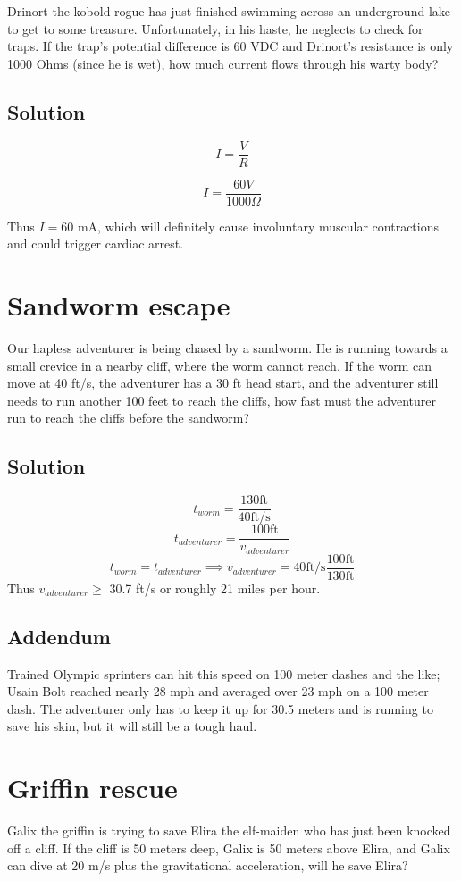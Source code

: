 \documentclass[12pt,letterpaper]{article}
\begin{document}
Drinort the kobold rogue has just finished swimming across an underground lake to get to some treasure. Unfortunately, in his haste, he neglects to check for traps. If the trap's potential difference is 60 VDC and Drinort's resistance is only 1000 Ohms (since he is wet), how much current flows through his warty body?

\subsection{Solution}

\[I = \frac{V}{R} \]

\[I = \frac{60 V}{1000 \Omega}\]

Thus $I = 60$ mA, which will definitely cause involuntary muscular contractions and could trigger cardiac arrest.

\section{Sandworm escape}

Our hapless adventurer is being chased by a sandworm. He is running towards a small crevice in a nearby cliff, where the worm cannot reach. If the worm can move at 40 ft/s, the adventurer has a 30 ft head start, and the adventurer still needs to run another 100 feet to reach the cliffs, how fast must the adventurer run to reach the cliffs before the sandworm?

\subsection{Solution}
\[t_{worm} = \frac{130 \textrm{ft}}{40 \textrm{ft/s}}\]
\[t_{adventurer} = \frac{100 \textrm{ft}}{v_{adventurer}}\]
\[t_{worm} = t_{adventurer} \implies v_{adventurer} = 40 \textrm{ft/s} \frac{100 \textrm{ft}}{130 \textrm{ft}} \]
Thus $v_{adventurer} \geq$ 30.7 ft/s or roughly 21 miles per hour.

\subsection{Addendum}
Trained Olympic sprinters can hit this speed on 100 meter dashes and the like;
Usain Bolt reached nearly 28 mph and averaged over 23 mph on a 100 meter dash.
The adventurer only has to keep it up for 30.5 meters and is running to save his skin, but it will still be a tough haul.

\section{Griffin rescue}
Galix the griffin is trying to save Elira the elf-maiden who has just been knocked off a cliff. If the cliff is 50 meters deep, Galix is 50 meters above Elira, and Galix can dive at 20 m/s plus the gravitational acceleration, will he save Elira?
\end{document}
